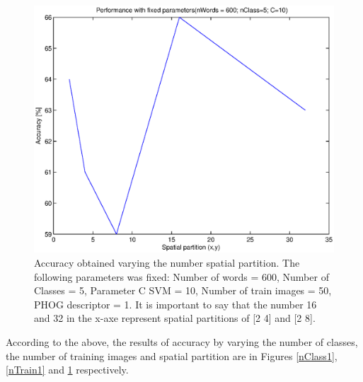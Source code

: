 \documentclass[10pt,twocolumn,letterpaper]{article}
\begin{document}
\begin{figure}[h]
\begin{center}
\includegraphics[width=1\linewidth]{images/nSpatial1.eps}
\end{center}
   \caption{
Accuracy obtained varying the number spatial partition. The following parameters was fixed: Number of words = 600, Number of Classes = 5, Parameter C SVM = 10, Number of train images = 50, PHOG descriptor = 1.
It is important to say that the number 16 and 32 in the x-axe represent spatial partitions of [2 4] and [2 8].
   }
\label{nSpatial1}
\end{figure}

According to the above, the results of accuracy by varying the number of classes, the number of training images and spatial partition are in Figures \ref{nClass1}, \ref{nTrain1} and \ref{nSpatial1} respectively.
\end{document}
